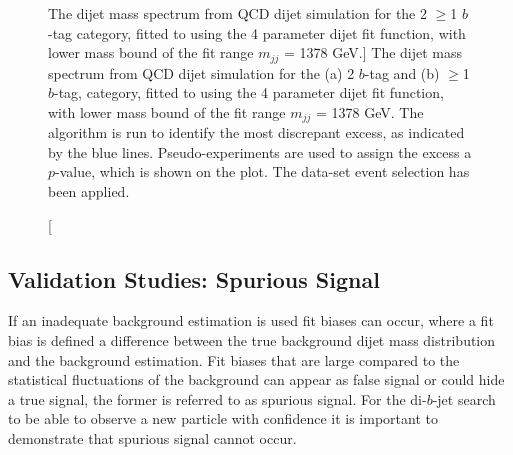 \begin{figure}[!ht]
  \begin{center}
    \captionsetup[subfigure]{aboveskip=0pt,justification=centering}
  \end{center}
  \vspace{-1em}
  \caption
      [The dijet mass spectrum from QCD dijet simulation for the  2 $\geq$1 $b$-tag category,
        fitted to using the 4 parameter dijet fit function, with lower mass bound of the fit range $m_{jj}$ = 1378 GeV.]
          { The dijet mass spectrum from QCD dijet simulation for the (a) 2 $b$-tag and (b) $\geq$1 $b$-tag,
    category, fitted to using the 4 parameter dijet fit function, with lower mass bound of the fit range $m_{jj}$ = 1378 GeV.
    The \bh{} algorithm is run to identify the most discrepant excess, as indicated by the blue lines.
    Pseudo-experiments are used to assign the excess a \mbox{$p$-value}, which is shown on the plot. 
    The \summer{} data-set event selection has been applied.}
  \label{fig:Short_4para_1378_figure1}
\end{figure}

\FloatBarrier
\subsection{Validation Studies: Spurious Signal}
\label{sec:bkg-summer_spusig}

If an inadequate background estimation is used fit biases can occur,
where a fit bias is defined a difference between the true background
dijet mass distribution and the background estimation.
Fit biases that are large compared to the statistical fluctuations of the background
can appear as false signal or could hide a true signal, the former is referred to as spurious signal.
For the di-$b$-jet search to be able to observe a new particle with confidence it is
important to demonstrate that spurious signal cannot occur.

